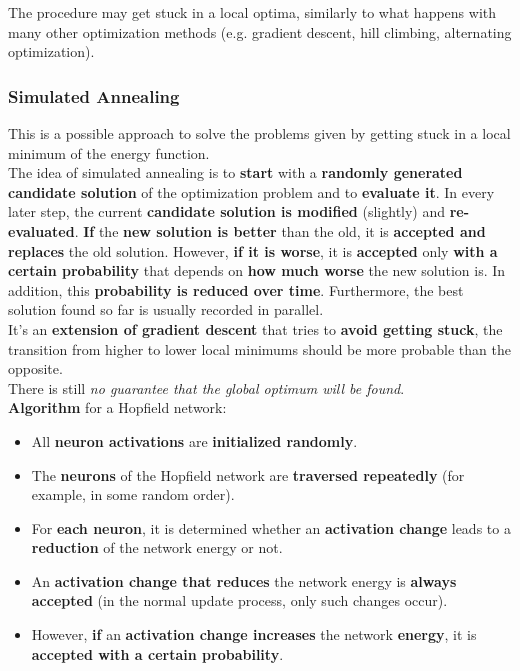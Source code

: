\documentclass[11pt]{article}
\begin{document}
		The procedure may get stuck in a local optima, similarly to what happens with many other optimization methods (e.g. gradient descent, hill climbing, alternating optimization).\\
		
		\newpage
		
		\subsubsection{Simulated Annealing}
		This is a possible approach to solve the problems given by getting stuck in a local minimum of the energy function.\\
		
		The idea of simulated annealing is to \textbf{start} with a \textbf{randomly generated candidate solution} of the optimization problem and to \textbf{evaluate it}. In every later step, the current \textbf{candidate solution is modified} (slightly) and \textbf{re-evaluated}. \textbf{If} the \textbf{new solution is better} than the old, it is \textbf{accepted and replaces} the old solution. However, \textbf{if it is worse}, it is \textbf{accepted} only \textbf{with a certain probability} that depends on \textbf{how much worse} the new solution is. In addition, this \textbf{probability is reduced over time}. Furthermore, the best solution found so far is usually recorded in parallel.\\
		
		It's an \textbf{extension of gradient descent} that tries to \textbf{avoid getting stuck}, the transition from higher to lower local minimums should be more probable than the opposite.\\
		
		There is still \textit{no guarantee that the global optimum will be found}.\\
		
		\textbf{Algorithm} for a Hopfield network:
		\begin{itemize}
			\item All \textbf{neuron activations} are \textbf{initialized randomly}.\\
			
			\item The \textbf{neurons} of the Hopfield network are \textbf{traversed repeatedly} (for example, in some random order).\\
			
			\item For \textbf{each neuron}, it is determined whether an \textbf{activation change} leads to a \textbf{reduction} of the network energy or not.\\
			
			\item An \textbf{activation change that reduces} the network energy is \textbf{always accepted} (in the normal update process, only such changes occur).\\
			
			\item However, \textbf{if} an \textbf{activation change increases} the network \textbf{energy}, it is \textbf{accepted with a certain probability}.\\
		\end{itemize}
		
\end{document}
